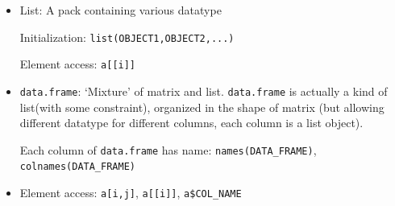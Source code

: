 \begin{itemize}[topsep=2pt,itemsep=0pt]
    \item List: A pack containing various datatype
    
    Initialization: \lstinline|list(OBJECT1,OBJECT2,...)|

    Element access: \lstinline|a[[i]]|
    \item \lstinline|data.frame|: `Mixture' of matrix and list. \lstinline|data.frame| is actually a kind of list(with some constraint), organized in the shape of matrix (but allowing different datatype for different columns, each column is a list object).
    
    Each column of \lstinline|data.frame| has name: \lstinline|names(DATA_FRAME)|, \lstinline|colnames(DATA_FRAME)|

    \item Element access: \lstinline|a[i,j]|, \lstinline|a[[i]]|, \lstinline|a$COL_NAME|
\end{itemize}

    

    
    
        

    





    




     




    

    








